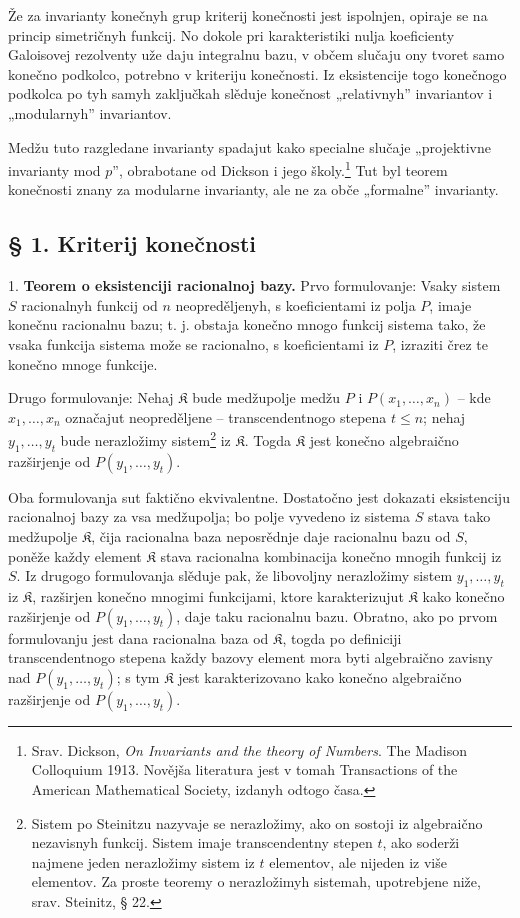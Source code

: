 \documentclass[11pt]{article}
\begin{document}
Že za invarianty konečnyh grup kriterij konečnosti jest ispolnjen, opiraje se na princip simetričnyh funkcij. No dokole pri karakteristiki nulja koeficienty Galoisovej rezolventy uže daju integralnu bazu, v občem slučaju ony tvoret samo konečno podkolco, potrebno v kriteriju konečnosti. Iz eksistencije togo konečnogo podkolca po tyh samyh zaključkah slěduje konečnost „relativnyh” invariantov i „modularnyh” invariantov.

Medžu tuto razgledane invarianty spadajut kako specialne slučaje „projektivne invarianty mod $p$”, obrabotane od Dickson i jego školy.\footnote{Srav. Dickson, \emph{On Invariants and the theory of Numbers}. The Madison Colloquium 1913. Novějša literatura jest v tomah Transactions of the American Mathematical Society, izdanyh odtogo časa.} Tut byl teorem konečnosti znany za modularne invarianty, ale ne za obče „formalne” invarianty.

\subsection*{§ 1. Kriterij konečnosti}

1. \textbf{Teorem o eksistenciji racionalnoj bazy.} Prvo formulovanje: Vsaky sistem $S$ racionalnyh funkcij od $n$ neopreděljenyh, s koeficientami iz polja $P$, imaje konečnu racionalnu bazu; t. j. obstaja konečno mnogo funkcij sistema tako, že vsaka funkcija sistema može se racionalno, s koeficientami iz $P$, izraziti črez te konečno mnoge funkcije.

Drugo formulovanje: Nehaj $\mathfrak K$ bude medžupolje medžu $P$ i $P(x_1,\ldots,x_n)$ -- kde $x_1,\ldots,x_n$ označajut neopreděljene -- transcendentnogo stepena $t\leq n$; nehaj $y_1,\ldots,y_t$ bude nerazložimy sistem\footnote{Sistem po Steinitzu nazyvaje se nerazložimy, ako on sostoji iz algebraično nezavisnyh funkcij. Sistem imaje transcendentny stepen $t$, ako soderži najmene jeden nerazložimy sistem iz $t$ elementov, ale nijeden iz više elementov. Za proste teoremy o nerazložimyh sistemah, upotrebjene niže, srav. Steinitz, § 22.} iz $\mathfrak K$. Togda $\mathfrak K$ jest konečno algebraično razširjenje od $P(y_1,\ldots,y_t)$.

Oba formulovanja sut faktično ekvivalentne. Dostatočno jest dokazati eksistenciju racionalnoj bazy za vsa medžupolja; bo polje vyvedeno iz sistema $S$ stava tako medžupolje $\mathfrak K$, čija racionalna baza neposrědnje daje racionalnu bazu od $S$, poněže každy element $\mathfrak K$ stava racionalna kombinacija konečno mnogih funkcij iz $S$. Iz drugogo formulovanja slěduje pak, že libovoljny nerazložimy sistem $y_1,\ldots,y_t$ iz $\mathfrak K$, razširjen konečno mnogimi funkcijami, ktore karakterizujut $\mathfrak K$ kako konečno razširjenje od $P(y_1,\ldots,y_t)$, daje taku racionalnu bazu. Obratno, ako po prvom formulovanju jest dana racionalna baza od $\mathfrak K$, togda po definiciji transcendentnogo stepena každy bazovy element mora byti algebraično zavisny nad $P(y_1,\ldots,y_t)$; s tym $\mathfrak K$ jest karakterizovano kako konečno algebraično razširjenje od $P(y_1,\ldots,y_t)$.
\end{document}
